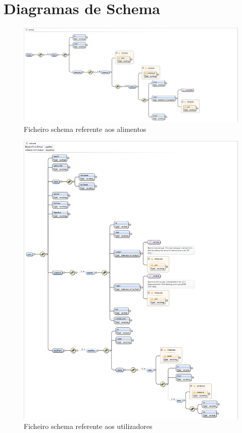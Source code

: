 \documentclass[twocolumn,twoside,11pt,a4paper]{article}
\begin{document}
\clearpage

\section{Diagramas de Schema}
\clearpage

\begin{figure}
\includegraphics[scale=0.56]{foods_schema}
    \caption{Ficheiro schema referente aos alimentos}
    \label{fig:foods_schema}
\end{figure}

\clearpage

\begin{figure}
\includegraphics[scale=0.42]{user_schema}
\caption{Ficheiro schema referente aos utilizadores}
\label{fig:user_schema}
\end{figure}
\clearpage
\end{document}
